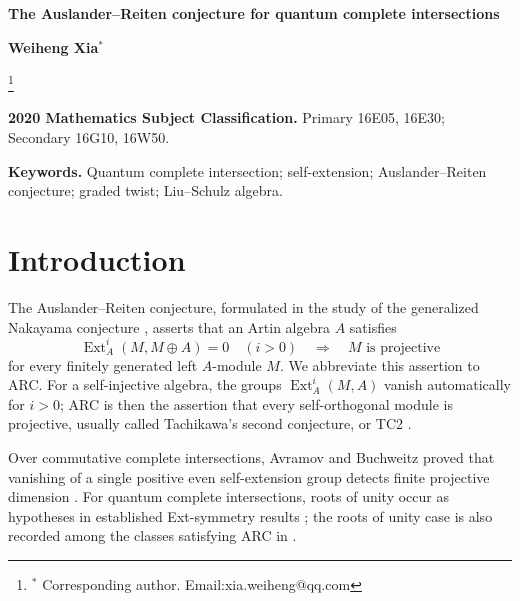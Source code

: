 \documentclass[11pt,a4paper]{article}
\numberwithin{equation}{section}
\theoremstyle{definition}
\theoremstyle{plain}
\theoremstyle{remark}
\DeclareMathOperator{\Ext}{Ext}
\begin{document}
\begin{center}
{\Large\bfseries The Auslander--Reiten conjecture for quantum complete intersections}
\end{center}

\medskip
\centerline{\textbf{Weiheng Xia}$^*$ }

 \renewcommand{\thefootnote}{\alph{footnote}}
 \setcounter{footnote}{-1} \footnote{ $^*$ Corresponding author.
 Email:xia.weiheng@qq.com}

\begin{abstract}
Let \(A\) be a finite-dimensional quantum complete intersection over an
arbitrary field. We prove that a finite-dimensional left \(A\)-module \(M\)
is projective whenever \(\Ext_A^1(M,M)=\Ext_A^2(M,M)=0\), with no
restriction on the multiplicative orders of the commutation parameters.
Consequently, \(A\) satisfies the Auslander--Reiten conjecture and
Tachikawa's second conjecture. The proof combines the gradability of rigid modules with
successive graded twists and the self-extension criterion of
Avramov and Buchweitz for commutative complete intersections. We derive a formula comparing ordinary self-extension groups under graded twisting, apply the resulting criterion to the Liu--Schulz algebras, and describe the successive twists explicitly in the four-generator case.
\end{abstract}
\noindent\textbf{2020 Mathematics Subject Classification.}
Primary 16E05, 16E30; Secondary 16G10, 16W50.
\par\smallskip
\noindent\textbf{Keywords.}
Quantum complete intersection; self-extension; Auslander--Reiten conjecture;
graded twist; Liu--Schulz algebra.

\section{Introduction}

The Auslander--Reiten conjecture, formulated in the study of the
generalized Nakayama conjecture \cite{AR75}, asserts that an Artin algebra
\(A\) satisfies
\[
 \Ext_A^i(M,M\oplus A)=0\quad(i>0)
 \quad\Longrightarrow\quad M\text{ is projective}
\]
for every finitely generated left \(A\)-module \(M\). We abbreviate this
assertion to ARC. For a self-injective algebra, the groups
\(\Ext_A^i(M,A)\) vanish automatically for \(i>0\); ARC is then the
assertion that every self-orthogonal module is projective, usually called
Tachikawa's second conjecture, or TC2 \cite{Tachikawa73}.

Over commutative complete intersections, Avramov and Buchweitz proved
that vanishing of a single positive even self-extension group detects
finite projective dimension \cite[Theorem 4.2]{AB00}. For quantum complete
intersections, roots of unity occur as hypotheses in established
Ext-symmetry results \cite[Theorems 3.3 and 3.4]{Bergh09}; the roots of
unity case is also recorded among the classes satisfying ARC in
\cite[Introduction]{CHQW23}.
\end{document}
